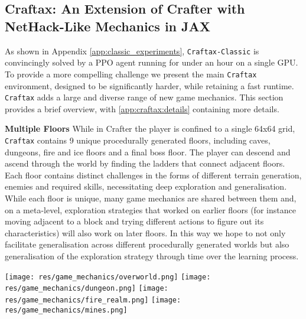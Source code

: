 \documentclass{article}
\theoremstyle{plain}
\theoremstyle{definition}
\theoremstyle{remark}
\begin{document}
\subsection{Craftax: An Extension of Crafter with NetHack-Like Mechanics in JAX}

As shown in Appendix \ref{app:classic_experiments}, \texttt{Craftax-Classic} is convincingly solved by a PPO agent running for under an hour on a single GPU.  To provide a more compelling challenge we present the main \texttt{Craftax} environment, designed to be significantly harder, while retaining a fast runtime.  \texttt{Craftax} adds a large and diverse range of new game mechanics. This section provides a brief overview, with \cref{app:craftax:details} containing more details.

\textbf{Multiple Floors}  While in Crafter the player is confined to a single 64x64 grid, \texttt{Craftax} contains 9 unique procedurally generated floors, including caves, dungeons, fire and ice floors and a final boss floor.  The player can descend and ascend through the world by finding the ladders that connect adjacent floors.  Each floor contains distinct challenges in the forms of different terrain generation, enemies and required skills, necessitating deep exploration and generalisation.  
While each floor is unique, many game mechanics are shared between them and, on a meta-level, exploration strategies that worked on earlier floors (for instance moving adjacent to a block and trying different actions to figure out its characteristics) will also work on later floors.  In this way we hope to not only facilitate generalisation across different procedurally generated worlds but also generalisation of the exploration strategy through time over the learning process.



{\centering
\texttt{[image: res/game\_mechanics/overworld.png]}
\texttt{[image: res/game\_mechanics/dungeon.png]}
\texttt{[image: res/game\_mechanics/fire\_realm.png]}
\texttt{[image: res/game\_mechanics/mines.png]}
\par}%
\end{document}
